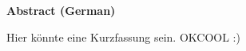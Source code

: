 \begin{center}\Large\bfseries Abstract (German)\end{center}\vspace*{1cm}\noindent 
Hier könnte eine Kurzfassung sein. OKCOOL :)